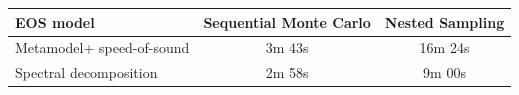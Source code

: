 \renewcommand{\arraystretch}{1.4}
\begin{tabular}{p{4.5cm}cc}
    \hline
    EOS model & Sequential Monte Carlo & Nested Sampling \\
    \hline
    Metamodel\newline + speed-of-sound & 3m 43s & 16m 24s \\
    Spectral decomposition & 2m 58s & 9m 00s \\
    \hline
\end{tabular}

